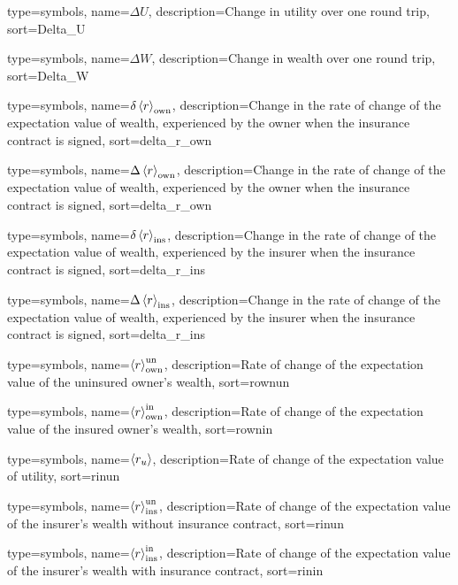 {
 type={symbols}, 
 name={\ensuremath{\Delta U}},
 description={Change in utility over one round trip},
 sort=Delta_U
}

{
 type={symbols}, 
 name={\ensuremath{\Delta W}},
 description={Change in wealth over one round trip},
 sort=Delta_W
}

{
 type={symbols}, 
 name={\ensuremath{\delta \ave{r}_{\text{own}}}},
 description={Change in the rate of change of the expectation value of wealth, experienced by the owner when the insurance contract is signed},
 sort=delta_r_own
}

{
 type={symbols}, 
 name={\ensuremath{\Delta \ave{r}_{\text{own}}}},
 description={Change in the rate of change of the expectation value of wealth, experienced by the owner when the insurance contract is signed},
 sort=delta_r_own
}

{
 type={symbols}, 
 name={\ensuremath{\delta \ave{r}_{\text{ins}}}},
 description={Change in the rate of change of the expectation value of wealth, experienced by the insurer when the insurance contract is signed},
 sort=delta_r_ins
}

{
 type={symbols}, 
 name={\ensuremath{\Delta \ave{r}_{\text{ins}}}},
 description={Change in the rate of change of the expectation value of wealth, experienced by the insurer when the insurance contract is signed},
 sort=delta_r_ins
}

{
  type={symbols}, 
  name={\ensuremath{\ave{r}_{\text{own}}^{\text{un}}}},
  description={Rate of change of the expectation value of the uninsured owner's wealth},
  sort=rownun
}

{
  type={symbols}, 
  name={\ensuremath{\ave{r}_{\text{own}}^{\text{in}}}},
  description={Rate of change of the expectation value of the insured owner's wealth},
  sort=rownin
}

{
  type={symbols}, 
  name={\ensuremath{\ave{r_u}}},
  description={Rate of change of the expectation value of utility},
  sort=rinun
}

{
  type={symbols}, 
  name={\ensuremath{\ave{r}_{\text{ins}}^{\text{un}}}},
  description={Rate of change of the expectation value of the insurer's wealth without insurance contract},
  sort=rinun
}

{
  type={symbols}, 
  name={\ensuremath{\ave{r}_{\text{ins}}^{\text{in}}}},
  description={Rate of change of the expectation value of the insurer's wealth with insurance contract},
  sort=rinin
}






